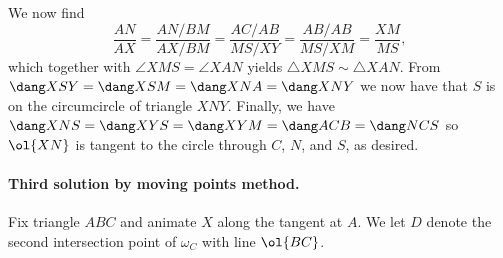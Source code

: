 We now find
\[
\frac{AN}{AX} = \frac{AN/BM}{AX/BM} = \frac{AC/AB}{MS/XY} = \frac{AB/AB}{MS/XM} = \frac{XM}{MS},
\]
which together with $\angle XMS = \angle XAN$ yields
$\triangle XMS \sim \triangle XAN$.
From $\dang XSY = \dang XSM = \dang XNA = \dang XNY$
we now have that $S$ is on the circumcircle of triangle $XNY$.
Finally, we have $\dang XNS = \dang XYS = \dang XYM = \dang ACB = \dang NCS$
so $\ol{XN}$ is tangent to the circle through $C$, $N$, and $S$, as desired.

\paragraph{Third solution by moving points method.}
Fix triangle $ABC$ and animate $X$ along the tangent at $A$.
We let $D$ denote the second intersection point of $\omega_C$
with line $\ol{BC}$.

